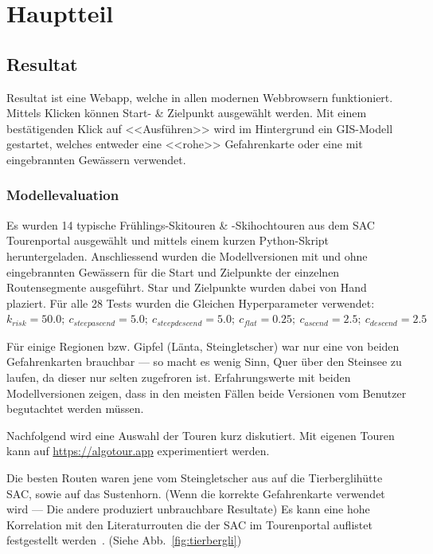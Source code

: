 \section{Hauptteil}
\subsection{Resultat}

Resultat ist eine Webapp, welche in allen modernen Webbrowsern funktioniert. Mittels Klicken können Start- \& Zielpunkt ausgewählt werden. Mit einem bestätigenden Klick auf <<Ausführen>> wird im Hintergrund ein GIS-Modell gestartet, welches entweder eine <<rohe>> Gefahrenkarte oder eine mit eingebrannten Gewässern verwendet.

\subsubsection{Modellevaluation}

Es wurden 14 typische Frühlings-Skitouren \& -Skihochtouren aus dem SAC Tourenportal ausgewählt und mittels einem kurzen Python-Skript heruntergeladen. Anschliessend wurden die Modellversionen mit und ohne eingebrannten Gewässern für die Start und Zielpunkte der einzelnen Routensegmente ausgeführt. Star und Zielpunkte wurden dabei von Hand plaziert. Für alle 28 Tests wurden die Gleichen Hyperparameter verwendet: $k_{risk}={50.0};\ c_{steepascend}={5.0};\ c_{steepdescend}={5.0};\ c_{flat}={0.25};\ c_{ascend}={2.5};\ c_{descend}={2.5}$

Für einige Regionen bzw. Gipfel (Länta, Steingletscher) war nur eine von beiden Gefahrenkarten brauchbar --- so macht es wenig Sinn, Quer über den Steinsee zu laufen, da dieser nur selten zugefroren ist. Erfahrungswerte mit beiden Modellversionen zeigen, dass in den meisten Fällen beide Versionen vom Benutzer begutachtet werden müssen.


Nachfolgend wird eine Auswahl der Touren kurz diskutiert. Mit eigenen Touren kann auf \url{https://algotour.app} experimentiert werden.

Die besten Routen waren jene vom Steingletscher aus auf die Tierberglihütte SAC, sowie auf das Sustenhorn. (Wenn die korrekte Gefahrenkarte verwendet wird --- Die andere produziert unbrauchbare Resultate) Es kann eine hohe Korrelation mit den Literaturrouten die der SAC im Tourenportal auflistet festgestellt werden~\cite{mmzentralch}. (Siehe Abb.\ \ref{fig:tierbergli})

